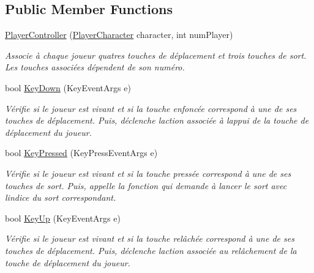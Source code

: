 \subsection*{Public Member Functions}
\begin{DoxyCompactItemize}
\item 
\hyperlink{class_tentacle_slicers_1_1inputs_1_1_player_controller_ad39c39196dc661b2c486d078bc5e6663}{Player\+Controller} (\hyperlink{class_tentacle_slicers_1_1actors_1_1_player_character}{Player\+Character} character, int num\+Player)
\begin{DoxyCompactList}\small\item\em Associe à chaque joueur quatres touches de déplacement et trois touches de sort. Les touches associées dépendent de son numéro. \end{DoxyCompactList}\item 
bool \hyperlink{class_tentacle_slicers_1_1inputs_1_1_player_controller_ade49d82ab4e91f4450ed1adc5ab7e0b3}{Key\+Down} (Key\+Event\+Args e)
\begin{DoxyCompactList}\small\item\em Vérifie si le joueur est vivant et si la touche enfoncée correspond à une de ses touches de déplacement. Puis, déclenche l\textquotesingle{}action associée à l\textquotesingle{}appui de la touche de déplacement du joueur. \end{DoxyCompactList}\item 
bool \hyperlink{class_tentacle_slicers_1_1inputs_1_1_player_controller_ab3e8efcf656fbebf2dfdc4d370029827}{Key\+Pressed} (Key\+Press\+Event\+Args e)
\begin{DoxyCompactList}\small\item\em Vérifie si le joueur est vivant et si la touche pressée correspond à une de ses touches de sort. Puis, appelle la fonction qui demande à lancer le sort avec l\textquotesingle{}indice du sort correspondant. \end{DoxyCompactList}\item 
bool \hyperlink{class_tentacle_slicers_1_1inputs_1_1_player_controller_aada78cf0829623ebf94cbaa681759bbf}{Key\+Up} (Key\+Event\+Args e)
\begin{DoxyCompactList}\small\item\em Vérifie si le joueur est vivant et si la touche relâchée correspond à une de ses touches de déplacement. Puis, déclenche l\textquotesingle{}action associée au relâchement de la touche de déplacement du joueur. \end{DoxyCompactList}\end{DoxyCompactItemize}


